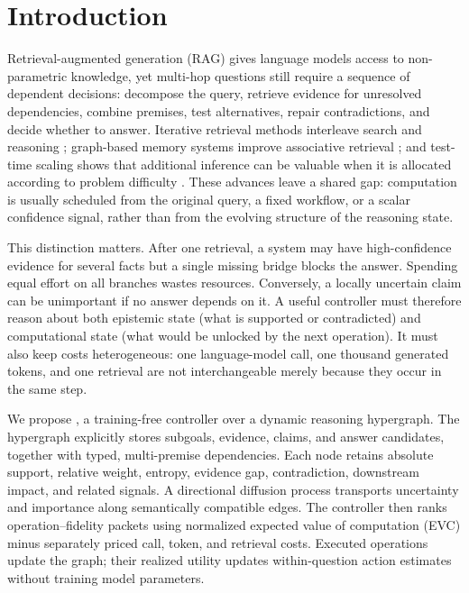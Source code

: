 \section{Introduction}

Retrieval-augmented generation (RAG) gives language models access to non-parametric knowledge, yet multi-hop questions still require a sequence of dependent decisions: decompose the query, retrieve evidence for unresolved dependencies, combine premises, test alternatives, repair contradictions, and decide whether to answer. Iterative retrieval methods interleave search and reasoning \citep{trivedi2023ircot}; graph-based memory systems improve associative retrieval \citep{gutierrez2024hipporag,gutierrez2025hipporag2}; and test-time scaling shows that additional inference can be valuable when it is allocated according to problem difficulty \citep{snell2025scaling}. These advances leave a shared gap: computation is usually scheduled from the original query, a fixed workflow, or a scalar confidence signal, rather than from the evolving structure of the reasoning state.

This distinction matters. After one retrieval, a system may have high-confidence evidence for several facts but a single missing bridge blocks the answer. Spending equal effort on all branches wastes resources. Conversely, a locally uncertain claim can be unimportant if no answer depends on it. A useful controller must therefore reason about both epistemic state (what is supported or contradicted) and computational state (what would be unlocked by the next operation). It must also keep costs heterogeneous: one language-model call, one thousand generated tokens, and one retrieval are not interchangeable merely because they occur in the same step.

We propose \textbf{\method{}}, a training-free controller over a dynamic reasoning hypergraph. The hypergraph explicitly stores subgoals, evidence, claims, and answer candidates, together with typed, multi-premise dependencies. Each node retains absolute support, relative weight, entropy, evidence gap, contradiction, downstream impact, and related signals. A directional diffusion process transports uncertainty and importance along semantically compatible edges. The controller then ranks operation--fidelity packets using normalized expected value of computation (EVC) minus separately priced call, token, and retrieval costs. Executed operations update the graph; their realized utility updates within-question action estimates without training model parameters.

